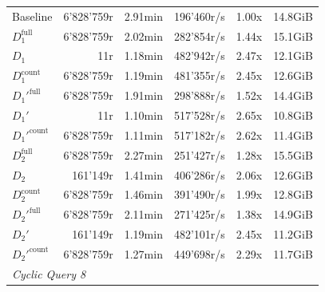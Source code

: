 \begin{longtable}{lrrrrr}
    \nopagebreak
    Baseline              &  6'828'759r           &  2.91min        &  196'460r/s          & 1.00x             & 14.8GiB   \\
    $D_1^{\text{full}}$   &  6'828'759r           &  2.02min        &  282'854r/s          & 1.44x             & 15.1GiB   \\
    \quad $D_1$           &  11r                  &  1.18min        &  482'942r/s          & 2.47x             & 12.1GiB   \\
    $D_1^{\text{count}}$  &  6'828'759r           &  1.19min        &  481'355r/s          & 2.45x             & 12.6GiB   \\
    $D_1'^{\text{full}}$  &  6'828'759r           &  1.91min        &  298'888r/s          & 1.52x             & 14.4GiB   \\
    \quad $D_1'$          &  11r                  &  1.10min        &  517'528r/s          & 2.65x             & 10.8GiB   \\
    $D_1'^{\text{count}}$ &  6'828'759r           &  1.11min        &  517'182r/s          & 2.62x             & 11.4GiB   \\
    $D_2^{\text{full}}$   &  6'828'759r           &  2.27min        &  251'427r/s          & 1.28x             & 15.5GiB   \\
    \quad $D_2$           &  161'149r             &  1.41min        &  406'286r/s          & 2.06x             & 12.6GiB   \\
    $D_2^{\text{count}}$  &  6'828'759r           &  1.46min        &  391'490r/s          & 1.99x             & 12.8GiB   \\
    $D_2'^{\text{full}}$  &  6'828'759r           &  2.11min        &  271'425r/s          & 1.38x             & 14.9GiB   \\
    \quad $D_2'$          &  161'149r             &  1.19min        &  482'101r/s          & 2.45x             & 11.2GiB   \\
    $D_2'^{\text{count}}$ &  6'828'759r           &  1.27min        &  449'698r/s          & 2.29x             & 11.7GiB   \\
    \midrule

    \multicolumn{6}{l}{\textit{Cyclic Query 8}} \\
    \midrule
    

\end{longtable}
